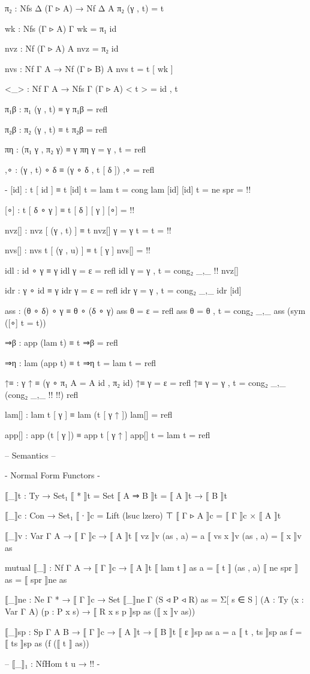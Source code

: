 \begin{code}
π₂ : Nfs Δ (Γ ▹ A) → Nf Δ A
π₂ (γ , t) = t

wk : Nfs (Γ ▹ A) Γ
wk = π₁ id

nvz : Nf (Γ ▹ A) A
nvz = π₂ id

nvs : Nf Γ A → Nf (Γ ▹ B) A
nvs t = t [ wk ]

<_> : Nf Γ A → Nfs Γ (Γ ▹ A)
< t > = id , t

π₁β : π₁ (γ , t) ≡ γ
π₁β = refl

π₂β : π₂ (γ , t) ≡ t
π₂β = refl

πη : (π₁ γ , π₂ γ) ≡ γ
πη {γ = γ , t} = refl

,∘ : (γ , t) ∘ δ ≡ (γ ∘ δ , t [ δ ])
,∘ = refl

{-
[id] : t [ id ] ≡ t
[id] {t = lam t} = cong lam [id]
[id] {t = ne spr} = {!!}

[∘] : t [ δ ∘ γ ] ≡ t [ δ ] [ γ ]
[∘] = {!!}

nvz[] : nvz [ (γ , t) ] ≡ t
nvz[] {γ = γ} {t = t} = {!!}

nvs[] : nvs t [ (γ , u) ] ≡ t [ γ ]
nvs[] = {!!}

idl : id ∘ γ ≡ γ
idl {γ = ε} = refl
idl {γ = γ , t} = cong₂ _,_ {!!} nvz[]

idr : γ ∘ id ≡ γ
idr {γ = ε} = refl
idr {γ = γ , t} = cong₂ _,_ idr [id]

ass : (θ ∘ δ) ∘ γ ≡ θ ∘ (δ ∘ γ)
ass {θ = ε} = refl
ass {θ = θ , t} = cong₂ _,_ ass (sym ([∘] {t = t}))

⇒β : app (lam t) ≡ t
⇒β = refl

⇒η : lam (app t) ≡ t
⇒η {t = lam t} = refl

↑≡ : γ ↑ ≡ (γ ∘ π₁ {A = A} id , π₂ id)
↑≡ {γ = ε} = refl
↑≡ {γ = γ , t} = cong₂ _,_ (cong₂ _,_ {!!} {!!}) refl

lam[] : lam t [ γ ] ≡ lam (t [ γ ↑ ])
lam[] = refl

app[] : app (t [ γ ]) ≡ app t [ γ ↑ ]
app[] {t = lam t} = refl

{-- Semantics --}

{- Normal Form Functors -}

⟦_⟧t : Ty → Set₁
⟦ * ⟧t = Set
⟦ A ⇒ B ⟧t = ⟦ A ⟧t → ⟦ B ⟧t

⟦_⟧c : Con → Set₁
⟦ ∙ ⟧c = Lift (lsuc lzero) ⊤
⟦ Γ ▹ A ⟧c = ⟦ Γ ⟧c × ⟦ A ⟧t

⟦_⟧v : Var Γ A → ⟦ Γ ⟧c → ⟦ A ⟧t
⟦ vz ⟧v (as , a) = a
⟦ vs x ⟧v (as , a) = ⟦ x ⟧v as

mutual
  ⟦_⟧ : Nf Γ A → ⟦ Γ ⟧c → ⟦ A ⟧t
  ⟦ lam t ⟧ as a = ⟦ t ⟧ (as , a)
  ⟦ ne spr ⟧ as = ⟦ spr ⟧ne as

  ⟦_⟧ne : Ne Γ * → ⟦ Γ ⟧c → Set
  ⟦_⟧ne {Γ} (S ◃ P ◃ R) as =
    Σ[ s ∈ S ] ({A : Ty} (x : Var Γ A) (p : P x s) → ⟦ R x s p ⟧sp as (⟦ x ⟧v as))

  ⟦_⟧sp : Sp Γ A B → ⟦ Γ ⟧c → ⟦ A ⟧t → ⟦ B ⟧t
  ⟦ ε ⟧sp as a = a
  ⟦ t , ts ⟧sp as f = ⟦ ts ⟧sp as (f (⟦ t ⟧ as))

-- ⟦_⟧₁ : NfHom t u → {!!}
-}

\end{code}

